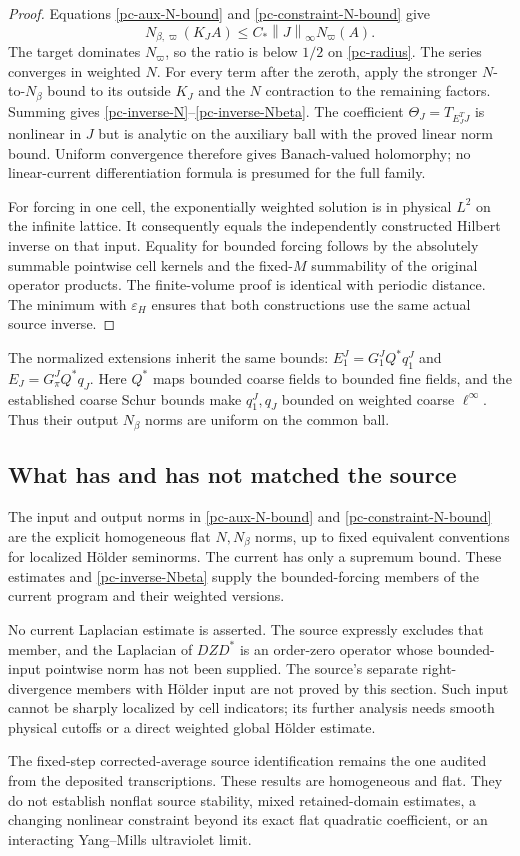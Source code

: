 \documentclass[11pt]{article}
\newcommand{\norm}[1]{\left\lVert#1\right\rVert}
\begin{document}
\begin{proof}
Equations \eqref{pc-aux-N-bound} and
\eqref{pc-constraint-N-bound} give
\[
 N_{\beta,\varpi}(K_JA)
          \le C_*\norm{J}_\infty N_\varpi(A).
\]
The target dominates $N_\varpi$, so the ratio is below $1/2$
on \eqref{pc-radius}. The series converges in weighted $N$.
For every term after the zeroth, apply the stronger $N$-to-$N_\beta$
bound to its outside $K_J$ and the $N$ contraction to the remaining
factors. Summing gives \eqref{pc-inverse-N}--\eqref{pc-inverse-Nbeta}.
The coefficient $\Theta_J=T_{E_J^TJ}$ is nonlinear in $J$ but is
analytic on the auxiliary ball with the proved linear norm bound.
Uniform convergence therefore gives Banach-valued holomorphy; no
linear-current differentiation formula is presumed for the full family.

For forcing in one cell, the exponentially weighted solution is in
physical $L^2$ on the infinite lattice. It consequently equals the
independently constructed Hilbert inverse on that input. Equality
for bounded forcing follows by the absolutely summable pointwise
cell kernels and the fixed-$M$ summability of the original operator
products. The finite-volume proof is identical with periodic
distance. The minimum with $\varepsilon_H$ ensures that both
constructions use the same actual source inverse.
\end{proof}

The normalized extensions inherit the same bounds:
$E_1^J=G_1^JQ^*q_1^J$ and $E_J=G_\pi^JQ^*q_J$.
Here $Q^*$ maps bounded coarse fields to bounded fine fields, and
the established coarse Schur bounds make $q_1^J,q_J$ bounded on
weighted coarse $\ell^\infty$. Thus their output $N_\beta$ norms
are uniform on the common ball.

\subsection{What has and has not matched the source}

The input and output norms in \eqref{pc-aux-N-bound} and
\eqref{pc-constraint-N-bound} are the explicit homogeneous flat
$N,N_\beta$ norms, up to fixed equivalent conventions for localized
H\"older seminorms. The current has only a supremum bound. These
estimates and \eqref{pc-inverse-Nbeta} supply the bounded-forcing
members of the current program and their weighted versions.

No current Laplacian estimate is asserted. The source expressly
excludes that member, and the Laplacian of $DZD^*$ is an order-zero
operator whose bounded-input pointwise norm has not been supplied.
The source's separate right-divergence members with H\"older input
are not proved by this section. Such input cannot be sharply
localized by cell indicators; its further analysis needs smooth
physical cutoffs or a direct weighted global H\"older estimate.

The fixed-step corrected-average source identification remains the
one audited from the deposited transcriptions. These results are
homogeneous and flat. They do not establish nonflat source stability,
mixed retained-domain estimates, a changing nonlinear constraint
beyond its exact flat quadratic coefficient, or an interacting
Yang--Mills ultraviolet limit.
\end{document}
